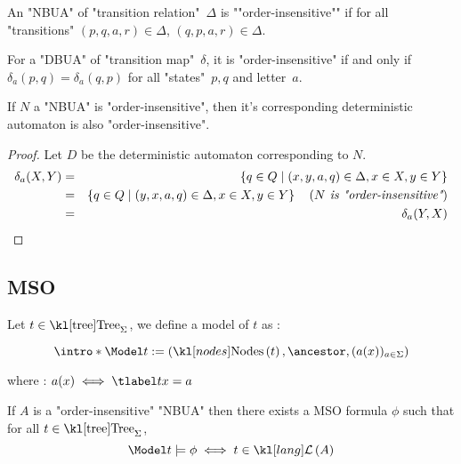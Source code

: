 \documentclass{article}
\begin{document}
\begin{definition}
	An "NBUA" of "transition relation"~$\Delta$ is ""order-insensitive"" if for all "transitions" $(p,q,a,r) \in \Delta$,
	$(q,p,a,r) \in \Delta$.
\end{definition}

\begin{remark}
	For a "DBUA" of "transition map"~$\delta$, it is "order-insensitive" if and only if
	$\delta_a (p,q) = \delta_a (q,p)$ for all "states"~$p,q$ and letter~$a$.
\end{remark}

\begin{lemma}
	If $N$ a "NBUA" is "order-insensitive", then it's corresponding deterministic automaton is also "order-insensitive".
\end{lemma}

\begin{proof}
	Let $D$ be the deterministic automaton corresponding to $N$.
	\begin{eqnarray*}
		\delta_a (X,Y) &=& \left\{q \in Q \mid (x,y,a,q) \in \Delta, x \in X, y \in Y\right\} \\
		&=& \left\{q \in Q \mid (y,x,a,q) \in \Delta, x \in X, y \in Y\right\}  \quad\left(\textit{$N$ is "order-insensitive"}\right) \\
		&=& \delta_a (Y,X)
	\end{eqnarray*}
\end{proof}

\subsection{MSO}

\begin{definition}
	Let $t \in \tree_{\Sigma}$, we define a model of $t$ as :

	\[\intro* \Model t := (\nodes t, \ancestor , (a (x))_{a \in \Sigma}) \]

	where : $a(x) \iff \tlabel t x = a$
\end{definition}

\begin{lemma}
	If $A$ is a "order-insensitive" "NBUA"  then there exists a MSO formula $\phi$ such that for all $t \in \tree_{\Sigma}$,
	\[ \Model t \models \phi \iff t \in \lang A \]
\end{lemma}
\end{document}
